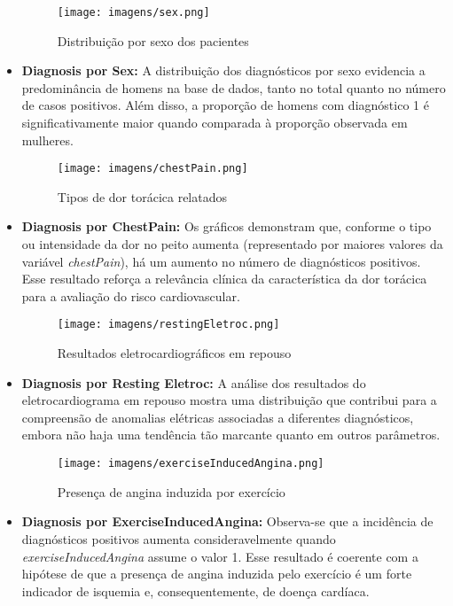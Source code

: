 \documentclass[conference]{IEEEtran}
\begin{document}
\begin{itemize}
    \begin{figure}[htbp]
        \centering
        \texttt{[image: imagens/sex.png]}
        \caption{Distribuição por sexo dos pacientes}
        \label{sexo}
    \end{figure}
    \item \textbf{Diagnosis por Sex:} A distribuição dos diagnósticos por sexo evidencia a predominância de homens na base de dados, tanto no total quanto no número de casos positivos. Além disso, a proporção de homens com diagnóstico 1 é significativamente maior quando comparada à proporção observada em mulheres.
    
    \begin{figure}[htbp]
        \centering
        \texttt{[image: imagens/chestPain.png]}
        \caption{Tipos de dor torácica relatados}
        \label{dor_torax}
    \end{figure}
    \item \textbf{Diagnosis por ChestPain:} Os gráficos demonstram que, conforme o tipo ou intensidade da dor no peito aumenta (representado por maiores valores da variável \textit{chestPain}), há um aumento no número de diagnósticos positivos. Esse resultado reforça a relevância clínica da característica da dor torácica para a avaliação do risco cardiovascular.
    

    \begin{figure}[htbp]
        \centering
        \texttt{[image: imagens/restingEletroc.png]}
        \caption{Resultados eletrocardiográficos em repouso}
        \label{eletro_repouso}
    \end{figure}
    \item \textbf{Diagnosis por Resting Eletroc:} A análise dos resultados do eletrocardiograma em repouso mostra uma distribuição que contribui para a compreensão de anomalias elétricas associadas a diferentes diagnósticos, embora não haja uma tendência tão marcante quanto em outros parâmetros.
    
    \begin{figure}[htbp]
        \centering
        \texttt{[image: imagens/exerciseInducedAngina.png]}
        \caption{Presença de angina induzida por exercício}
        \label{angina}
    \end{figure}
    \item \textbf{Diagnosis por ExerciseInducedAngina:} Observa-se que a incidência de diagnósticos positivos aumenta consideravelmente quando \textit{exerciseInducedAngina} assume o valor 1. Esse resultado é coerente com a hipótese de que a presença de angina induzida pelo exercício é um forte indicador de isquemia e, consequentemente, de doença cardíaca.
\end{itemize}
\end{document}
